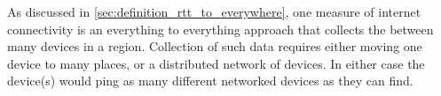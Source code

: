 As discussed in \cref{sec:definition_rtt_to_everywhere}, one measure of internet connectivity is an everything to everything approach that collects the \rtt between many devices in a region. Collection of such data requires either moving one device to many places, or a distributed network of devices. In either case the device(s) would ping as many different networked devices as they can find.
